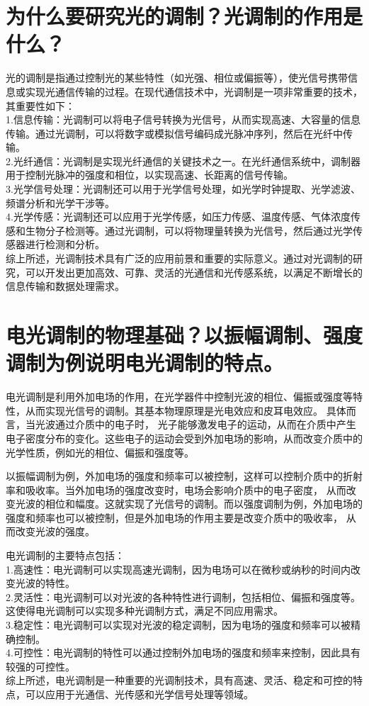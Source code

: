 \documentclass[12pt, a4paper, oneside]{article}
\begin{document}
\begin{spacing}{2.0}
\section{为什么要研究光的调制？光调制的作用是什么？}
光的调制是指通过控制光的某些特性（如光强、相位或偏振等），使光信号携带信息或实现光通信传输的过程。在现代通信技术中，光调制是一项非常重要的技术，其重要性如下：
\\
1.信息传输：光调制可以将电子信号转换为光信号，从而实现高速、大容量的信息传输。通过光调制，可以将数字或模拟信号编码成光脉冲序列，然后在光纤中传输。
\\
2.光纤通信：光调制是实现光纤通信的关键技术之一。在光纤通信系统中，调制器用于控制光脉冲的强度和相位，以实现高速、长距离的信号传输。
\\
3.光学信号处理：光调制还可以用于光学信号处理，如光学时钟提取、光学滤波、频谱分析和光学干涉等。
\\
4.光学传感：光调制还可以应用于光学传感，如压力传感、温度传感、气体浓度传感和生物分子检测等。通过光调制，可以将物理量转换为光信号，然后通过光学传感器进行检测和分析。
\\
综上所述，光调制技术具有广泛的应用前景和重要的实际意义。通过对光调制的研究，可以开发出更加高效、可靠、灵活的光通信和光传感系统，以满足不断增长的信息传输和数据处理需求。
\section{电光调制的物理基础？以振幅调制、强度调制为例说明电光调制的特点。}
电光调制是利用外加电场的作用，在光学器件中控制光波的相位、偏振或强度等特性，从而实现光信号的调制。其基本物理原理是光电效应和皮耳电效应。
具体而言，当光波通过介质中的电子时，
光子能够激发电子的运动，从而在介质中产生电子密度分布的变化。这些电子的运动会受到外加电场的影响，从而改变介质中的光学性质，例如光的相位、偏振和强度等。

以振幅调制为例，外加电场的强度和频率可以被控制，这样可以控制介质中的折射率和吸收率。当外加电场的强度改变时，电场会影响介质中的电子密度，
从而改变光波的相位和幅度。这就实现了光信号的调制。而以强度调制为例，外加电场的强度和频率也可以被控制，但是外加电场的作用主要是改变介质中的吸收率，
从而改变光波的强度。

电光调制的主要特点包括：
\\
1.高速性：电光调制可以实现高速光调制，因为电场可以在微秒或纳秒的时间内改变光波的特性。
\\
2.灵活性：电光调制可以对光波的各种特性进行调制，包括相位、偏振和强度等。这使得电光调制可以实现多种光调制方式，满足不同应用需求。
\\
3.稳定性：电光调制可以实现对光波的稳定调制，因为电场的强度和频率可以被精确控制。
\\
4.可控性：电光调制的特性可以通过控制外加电场的强度和频率来控制，因此具有较强的可控性。
\\
综上所述，电光调制是一种重要的光调制技术，具有高速、灵活、稳定和可控的特点，可以应用于光通信、光传感和光学信号处理等领域。





\end{spacing}
\end{document}

